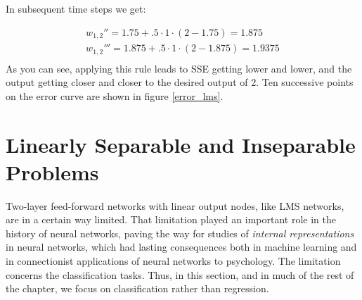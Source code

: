 In subsequent time steps we get:

\begin{eqnarray*}
w_{1,2}'' = 1.75 + .5 \cdot 1 \cdot (2 - 1.75) = 1.875 \\
w_{1,2}''' = 1.875 + .5 \cdot 1 \cdot (2 - 1.875) = 1. 9375 \\
\end{eqnarray*}
As you can see, applying this rule leads to SSE getting lower and lower, and the output getting closer and closer to the desired output of 2. Ten successive points on the error curve are shown in figure \ref{error_lms}.

\section{Linearly Separable and Inseparable Problems}
\label{linearlySeparable}


Two-layer feed-forward networks with linear output nodes, like LMS networks, are in a certain way limited. That limitation played  an important role in the history of neural networks, paving the way for studies of \emph{internal representations} in neural networks, which had lasting consequences both in machine learning and in connectionist applications of neural networks to psychology.  The limitation concerns the  classification tasks. Thus, in this section, and in much of the rest of the chapter, we focus on classification rather than regression.

